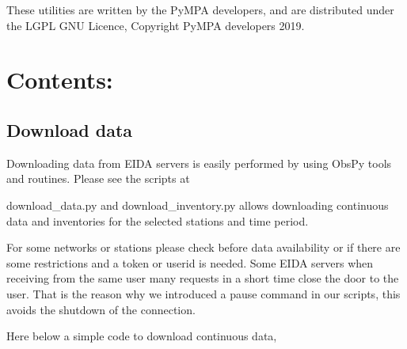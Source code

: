 \documentclass[a4paper,12pt,english]{sphinxmanual}
\begin{document}
These utilities are written by the PyMPA developers, and are distributed under the LGPL GNU Licence, Copyright PyMPA developers 2019.


\section{Contents:}
\label{\detokenize{input:contents}}

\subsection{Download data}
\label{\detokenize{sub/input.download_data:download-data}}\label{\detokenize{sub/input.download_data::doc}}
Downloading data from EIDA servers is easily performed by using ObsPy tools
and routines. Please see the scripts at 

download\_data.py and download\_inventory.py allows downloading continuous data and inventories for the selected stations
and time period.

For some networks or stations please check before data availability or if there are some restrictions and a token
or userid is needed. Some EIDA servers when receiving from the same user many requests in a short time
close the door to the user. That is the reason why we introduced a pause command in our scripts, this avoids
the shutdown of the connection.

Here below a simple code to download continuous data,
\end{document}
